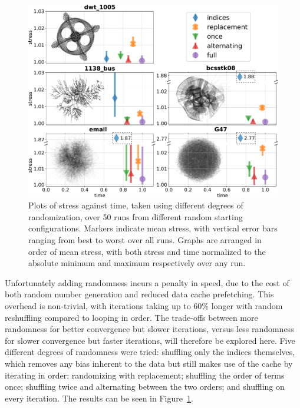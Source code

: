 \begin{figure}
  \centering
  \includegraphics[width=.9\textwidth]{stress/random.pdf}
  \caption[A comparison of methods for term order randomisation]{Plots of stress against time, taken using different degrees of randomization, over 50 runs from different random starting configurations. Markers indicate mean stress, with vertical error bars ranging from best to worst over all runs.
  Graphs are arranged in order of mean stress, with both stress and time normalized to the absolute minimum and maximum respectively over any run.
  }
  \label{fig:randomisation}
\end{figure}

Unfortunately adding randomness incurs a penalty in speed, due to the cost of both random number generation and reduced data cache prefetching.
This overhead is non-trivial, with iterations taking up to 60\% longer with random reshuffling compared to looping in order. 
The trade-offs between more randomness for better convergence but slower iterations, versus less randomness for slower convergence but faster iterations, will therefore be explored here.
Five different degrees of randomness were tried: shuffling only the indices themselves, which removes any bias inherent to the data but still makes use of the cache by iterating in order; randomizing with replacement; shuffling the order of terms once; shuffling twice and alternating between the two orders; and shuffling on every iteration.
The results can be seen in Figure~\ref{fig:randomisation}.

